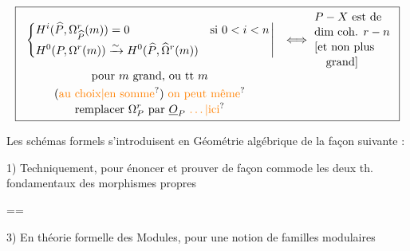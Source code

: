 \[
\resizebox{\linewidth}{!}{$\displaystyle\boxed{\begin{array}{cl}
\left.\left\{\begin{aligned}
&H^i(\widehat P,\Omega^r_{\widehat P}(m))=0 &&\text{si }0<i<n\\
&H^0(P,\Omega^r(m))\xrightarrow{\sim} H^0(\widehat P,\widehat\Omega^r(m))
\end{aligned}\right.\right|&
\Longleftrightarrow\ \begin{aligned}
&P-X\ \text{est de}\\[-2pt]
&\text{dim coh. }r-n\\[-2pt]
&[\text{et non plus}\\[-2pt]
&\quad\text{grand}]
\end{aligned}\\[3pt]
\begin{gathered}
\text{pour }m\text{ grand, ou tt }m\\
\text{(\unsure{au choix|en somme}) \unsure{on peut même}}\\[-2pt]
\text{remplacer }\Omega^r_P\text{ par }\underline O_P\ \unsure{\ldots|\text{ici}}
\end{gathered}&
\end{array}}$}
\]

Les schémas formels s'introduisent en Géométrie algébrique de la façon suivante :

1) Techniquement, pour énoncer et prouver de façon commode les deux th. fondamentaux des morphismes propres

\begingroup
\newsavebox{\ScanEightItem}
\setbox\ScanEightItem=\vbox{\hsize=\linewidth\noindent
{} }

\noindent{}3) En théorie formelle des Modules, pour   une notion de familles modulaires\par
\smallskip\noindent\usebox{\ScanEightItem}\par
\noindent{}
\endgroup

